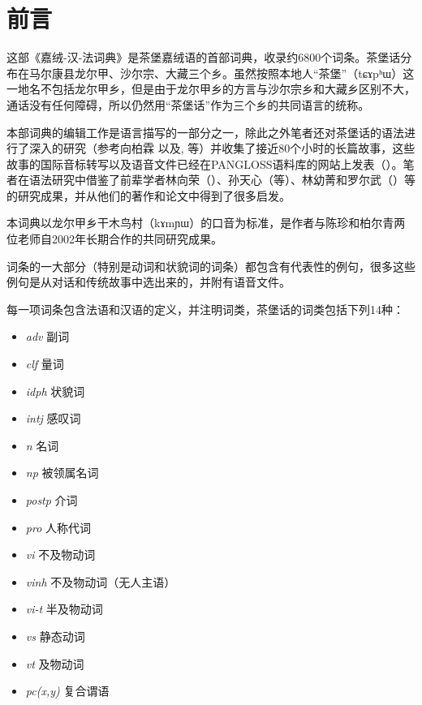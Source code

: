 \documentclass[oldfontcommands,oneside,a4paper,11pt]{article}
\newcommand{\ipa}[1]{{\phon #1}} %
\newcommand{\zh}[1]{{\cn #1}}
\newcommand{\ital}[1]{{\normalfont\textit{#1}}}
\begin{document}
 
\cn
\section*{\zh{前言}}

这部《嘉绒-汉-法词典》是茶堡嘉绒语的首部词典，收录约6800个词条。茶堡话分布在马尔康县龙尔甲、沙尔宗、大藏三个乡。虽然按照本地人“茶堡”（\ipa{tɕɤpʰɯ}）这一地名不包括龙尔甲乡，但是由于龙尔甲乡的方言与沙尔宗乡和大藏乡区别不大，通话没有任何障碍，所以仍然用“茶堡话”作为三个乡的共同语言的统称。

本部词典的编辑工作是语言描写的一部分之一，除此之外笔者还对茶堡话的语法进行了深入的研究（参考向柏霖 \citeyear{jacques08}以及\citealt{jacques12incorp, jacques13tropative, jacques14antipassive,  jacques15spontaneous}, \citeyear{jacques15causative, jacques16relatives}等）并收集了接近80个小时的长篇故事，这些故事的国际音标转写以及语音文件已经在PANGLOSS语料库的网站上发表（\citealt{michailovsky14pangloss}）。笔者在语法研究中借鉴了前辈学者林向荣（\citeyear{linxr93jiarong}）、孙天心（\citeyear{jackson00sidaba, jackson04zhuangmaoci, jackson06paisheng, jackson14morpho}等）、林幼菁和罗尔武（\citeyear{linluo03}）等的研究成果，并从他们的著作和论文中得到了很多启发。


本词典以龙尔甲乡干木鸟村（\ipa{kɤmɲɯ}）的口音为标准，是作者与陈珍和柏尔青两位老师自2002年长期合作的共同研究成果。

词条的一大部分（特别是动词和状貌词的词条）都包含有代表性的例句，很多这些例句是从对话和传统故事中选出来的，并附有语音文件。

每一项词条包含法语和汉语的定义，并注明词类，茶堡话的词类包括下列14种：

\begin{itemize}
\item \ital{adv} 副词
\item \ital{clf} 量词
\item \ital{idph} 状貌词
\item \ital{intj} 感叹词
\item \ital{n} 名词
\item \ital{np} 被领属名词
\item \ital{postp} 介词
\item \ital{pro} 人称代词
\item \ital{vi} 不及物动词
\item \ital{vinh} 不及物动词（无人主语）
\item \ital{vi-t} 半及物动词
\item \ital{vs} 静态动词
\item \ital{vt} 及物动词
\item \ital{pc(x,y)} 复合谓语
\end{itemize}
\end{document}
